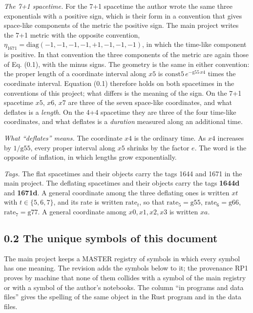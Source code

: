 \documentclass[
  10pt,
]{article}
\begin{document}
\emph{The 7+1 spacetime.} For the 7+1 spacetime the author wrote the
same three exponentials with a positive sign, which is their form in a
convention that gives space-like components of the metric the positive
sign. The main project writes the 7+1 metric with the opposite
convention, \(\eta_{1671}=\mathrm{diag}(-1,-1,-1,-1,+1,-1,-1,-1)\), in
which the time-like component is positive. In that convention the three
components of the metric are again those of Eq. (0.1), with the minus
signs. The geometry is the same in either convention: the proper length
of a coordinate interval along \(x5\) is
\(\mathrm{const5}\,e^{-\mathrm{g55}\,x4}\) times the coordinate
interval. Equation (0.1) therefore holds on both spacetimes in the
conventions of this project; what differs is the meaning of the sign. On
the 7+1 spacetime \(x5\), \(x6\), \(x7\) are three of the seven
space-like coordinates, and what deflates is a \emph{length}. On the 4+4
spacetime they are three of the four time-like coordinates, and what
deflates is a \emph{duration} measured along an additional time.

\emph{What ``deflates'' means.} The coordinate \(x4\) is the ordinary
time. As \(x4\) increases by \(1/\mathrm{g55}\), every proper interval
along \(x5\) shrinks by the factor \(e\). The word is the opposite of
inflation, in which lengths grow exponentially.

\emph{Tags.} The flat spacetimes and their objects carry the tags 1644
and 1671 in the main project. The deflating spacetimes and their objects
carry the tags \textbf{1644d} and \textbf{1671d}. A general coordinate
among the three deflating ones is written \(xt\) with \(t\in\{5,6,7\}\),
and its rate is written \(\mathrm{rate}_t\), so that
\(\mathrm{rate}_5=\mathrm{g55}\), \(\mathrm{rate}_6=\mathrm{g66}\),
\(\mathrm{rate}_7=\mathrm{g77}\). A general coordinate among
\(x0,x1,x2,x3\) is written \(xa\).

\hypertarget{the-unique-symbols-of-this-document}{%
\subsection{0.2 The unique symbols of this
document}\label{the-unique-symbols-of-this-document}}

The main project keeps a MASTER registry of symbols in which every
symbol has one meaning. The revision adds the symbols below to it; the
provenance RP1 proves by machine that none of them collides with a
symbol of the main registry or with a symbol of the author's notebooks.
The column ``in programs and data files'' gives the spelling of the same
object in the Rust program and in the data files.
\end{document}
